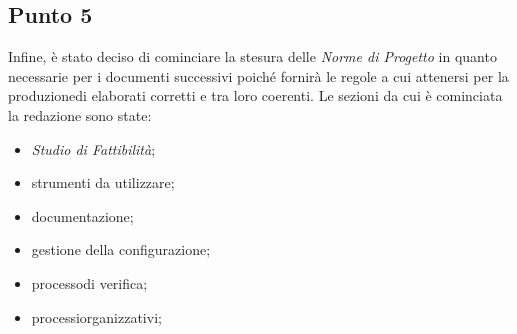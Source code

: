     \subsection{Punto 5}
        Infine, è stato deciso di cominciare la stesura delle \textit{Norme di Progetto} in quanto necessarie per i documenti successivi poiché fornirà le regole a cui attenersi per la produzione\glosp di elaborati corretti e tra loro coerenti. Le sezioni da cui è cominciata la redazione sono state:
        \begin{itemize}
            \item \textit{Studio di Fattibilità};
            \item strumenti da utilizzare;
            \item documentazione;
            \item gestione della configurazione;
            \item processo\glosp di verifica;
            \item processi\glosp organizzativi;
        \end{itemize}